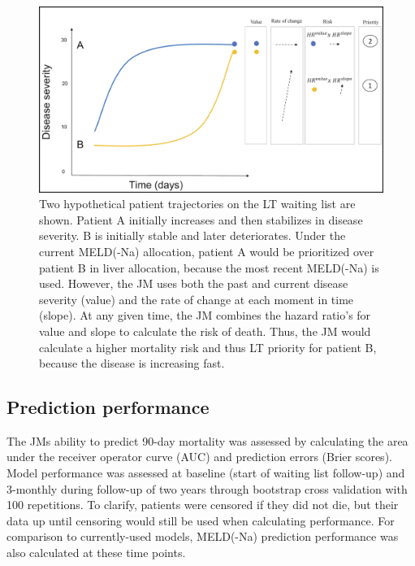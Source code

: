\documentclass[11pt,english,]{book} %
\begin{document}
\begin{figure}
\includegraphics[width=1\linewidth]{figures/jm/figure 1} \caption{Two hypothetical patient trajectories on the LT waiting list are shown. Patient A initially increases and then stabilizes in disease severity. B is initially stable and later deteriorates. Under the current MELD(-Na) allocation, patient A would be prioritized over patient B in liver allocation, because the most recent MELD(-Na) is used. However, the JM uses both the past and current disease severity (value) and the rate of change at each moment in time (slope). At any given time, the JM combines the hazard ratio’s for value and slope to calculate the risk of death. Thus, the JM would calculate a higher mortality risk and thus LT priority for patient B, because the disease is increasing fast.}\label{fig:jm-fig1}
\end{figure}

\hypertarget{prediction-performance}{%
\subsection*{Prediction performance}\label{prediction-performance}}

The JMs ability to predict 90-day mortality was assessed by calculating the area under the receiver operator curve (AUC) and prediction errors (Brier scores). Model performance was assessed at baseline (start of waiting list follow-up) and 3-monthly during follow-up of two years through bootstrap cross validation with 100 repetitions. To clarify, patients were censored if they did not die, but their data up until censoring would still be used when calculating performance. For comparison to currently-used models, MELD(-Na) prediction performance was also calculated at these time points.
\end{document}
